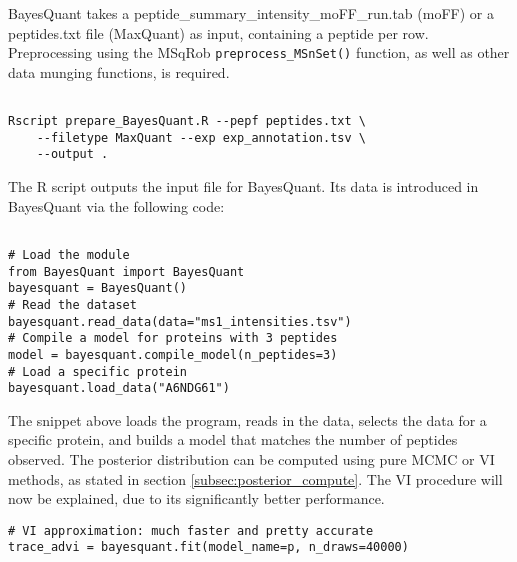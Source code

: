 BayesQuant takes a peptide\_summary\_intensity\_moFF\_run.tab (moFF) or a peptides.txt file (MaxQuant) as input, containing a peptide per row. Preprocessing using the MSqRob \texttt{preprocess\_MSnSet()} function, as well as other data munging functions, is required.


\begin{verbatim}

Rscript prepare_BayesQuant.R --pepf peptides.txt \
    --filetype MaxQuant --exp exp_annotation.tsv \
    --output .
\end{verbatim}

The R script outputs the input file for BayesQuant. Its data is introduced in BayesQuant via the following code:

\begin{verbatim}

# Load the module
from BayesQuant import BayesQuant
bayesquant = BayesQuant()
# Read the dataset
bayesquant.read_data(data="ms1_intensities.tsv")
# Compile a model for proteins with 3 peptides
model = bayesquant.compile_model(n_peptides=3)
# Load a specific protein
bayesquant.load_data("A6NDG61")
\end{verbatim}

The snippet above loads the program, reads in the data, selects the data for a specific protein, and builds a model that matches the number of peptides observed. The posterior distribution can be computed using pure MCMC or VI methods, as stated in section \ref{subsec:posterior_compute}. The VI procedure will now be explained, due to its significantly better performance.

\begin{verbatim}
# VI approximation: much faster and pretty accurate
trace_advi = bayesquant.fit(model_name=p, n_draws=40000)
\end{verbatim}

